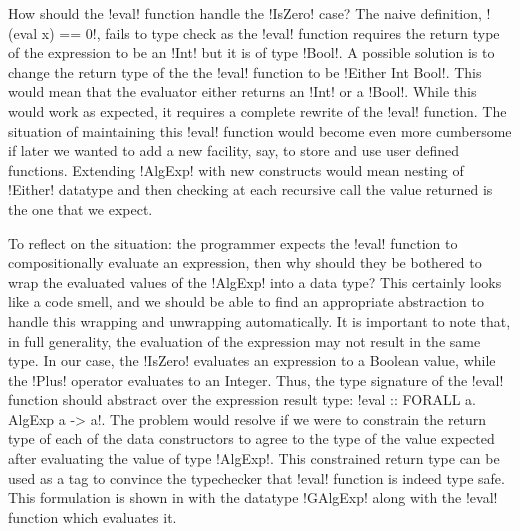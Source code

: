 \documentclass[screen,nonacm,manuscript,review]{acmart} %
\begin{document}
How should the !eval! function handle the !IsZero! case? The naive
definition, !(eval x) == 0!, fails to type check as the !eval!
function requires the return type of the expression to be an !Int! but
it is of type !Bool!. A possible solution is to change the return type
of the the !eval! function to be !Either Int Bool!. This would mean
that the evaluator either returns an !Int! or a !Bool!. While this would work as
expected, it requires a complete rewrite of the !eval! function. The
situation of maintaining this !eval! function would become even more
cumbersome if later we wanted to add a new facility, say, to store and use user
defined functions. Extending !AlgExp! with new constructs would mean
nesting of !Either! datatype and then checking at each recursive
call the value returned is the one that we expect.

To reflect on the situation: the programmer
expects the !eval! function to compositionally evaluate an
expression, then why should they be bothered to wrap the
evaluated values of the !AlgExp! into a data type? This certainly
looks like a code smell, and we should be able to find an appropriate
abstraction to handle this wrapping and unwrapping automatically.
It is important to note that, in full generality, the evaluation of the expression
may not result in the same type. In our case, the !IsZero! evaluates
an expression to a Boolean value, while the !Plus! operator evaluates
to an Integer. Thus, the type signature of the !eval! function should
abstract over the expression result type:
!eval :: FORALL a. AlgExp a -> a!. The problem
would resolve if we were to constrain the return type of each of the
data constructors to agree to the type of the value expected after
evaluating the value of type !AlgExp!. This constrained return type
can be used as a tag to convince the typechecker that !eval! function
is indeed type safe. This formulation is shown in
 with the datatype !GAlgExp! along with the !eval!
function which evaluates it.
\end{document}

